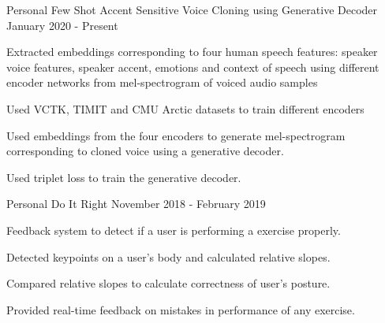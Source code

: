 \smallskip

\begin{cventries}

\cventry
    {Personal} %
    {Few Shot Accent Sensitive Voice Cloning using Generative Decoder} %
    {} %
    {January 2020 - Present} %
    {
      \begin{cvitems} %
        \item {Extracted embeddings corresponding to four human speech features: speaker voice features, speaker accent, emotions and context of speech using different encoder networks from mel-spectrogram of voiced audio samples}
        \item {Used VCTK, TIMIT and CMU Arctic datasets to train different encoders}
        \item {Used embeddings from the four encoders to generate mel-spectrogram corresponding to cloned voice using a generative decoder.}
        \item {Used triplet loss to train the generative decoder.}
      \end{cvitems}
    }
    
    
  \cventry
    {Personal} %
    {Do It Right} %
    {} %
    {November 2018 - February 2019} %
    {
      \begin{cvitems} %
        \item{Feedback system to detect if a user is performing a exercise properly.}
        \item{Detected keypoints on a user's body and calculated relative slopes.}
        \item{Compared relative slopes to calculate correctness of user's posture.}
        \item{Provided real-time feedback on mistakes in performance of any exercise.}
      \end{cvitems}
    }



\end{cventries}
